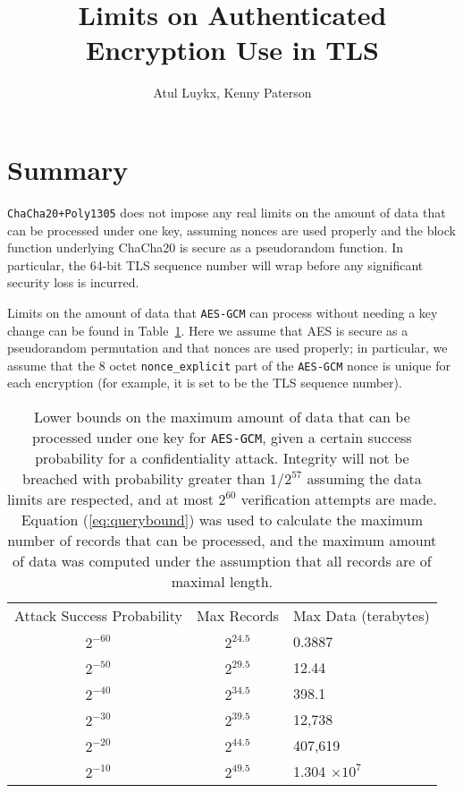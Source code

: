 \documentclass{article}
\title{Limits on Authenticated Encryption Use in TLS}
\author{Atul Luykx, Kenny Paterson}
\begin{document}
\maketitle



\section{Summary}
\texttt{ChaCha20+Poly1305} does not impose any real limits on the amount of data that can be processed under one key, assuming nonces are used properly and the block function underlying ChaCha20 is secure as a pseudorandom function. In particular, the 64-bit TLS sequence number will wrap before any significant security loss is incurred. 


Limits on the amount of data that \texttt{AES-GCM} can process without needing a key change can be found in Table~\ref{table:gcm-bounds}. Here we  assume that AES is secure as a pseudorandom permutation and that nonces are used properly; in particular, we assume that the 8 octet \verb|nonce_explicit| part of the \texttt{AES-GCM} nonce is unique for each encryption (for example, it is set to be the TLS sequence number). 


\medskip
\begin{table}[H]
  \centering
  \caption{Lower bounds on the maximum amount of data that can be processed under one key for \texttt{AES-GCM}, given a certain success probability for a confidentiality attack. Integrity will not be breached with probability greater than $1/2^{57}$ assuming the data limits are respected, and at most $2^{60}$ verification attempts are made. Equation (\ref{eq:querybound}) was used to calculate the maximum number of records that can be processed, and the maximum amount of data was computed under the assumption that all records are of maximal length.}\label{table:gcm-bounds}
  \begin{tabular}{ccl}
    \toprule
    Attack Success Probability  & Max Records & Max Data (terabytes)\\
    \cmidrule{1-3}
    $2^{-60}$ & $2^{24.5}$ & 0.3887\\
    $2^{-50}$ & $2^{29.5}$ & 12.44 \\
    $2^{-40}$ & $2^{34.5}$ & 398.1\\
    $2^{-30}$ & $2^{39.5}$ & 12,738\\
    $2^{-20}$ & $2^{44.5}$ & 407,619\\
    $2^{-10}$ & $2^{49.5}$ & 1.304 $\times 10^7$\\
    \bottomrule
  \end{tabular}
\end{table}
\medskip
\end{document}
